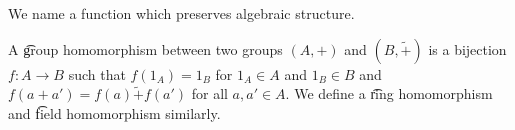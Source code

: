 

We name a function which preserves algebraic structure.


A \t{group homomorphism} between two groups $(A, +)$ and $(B, \tilde{+})$ is a bijection $f: A \to B$ such that $f(1_A) = 1_B$ for  $1_A \in A$ and $1_B \in B$ and $f(a + a') = f(a) \tilde{+} f(a')$ for all $a, a' \in A$.
We define a \t{ring homomorphism} and \t{field homomorphism} similarly.

\blankpage
